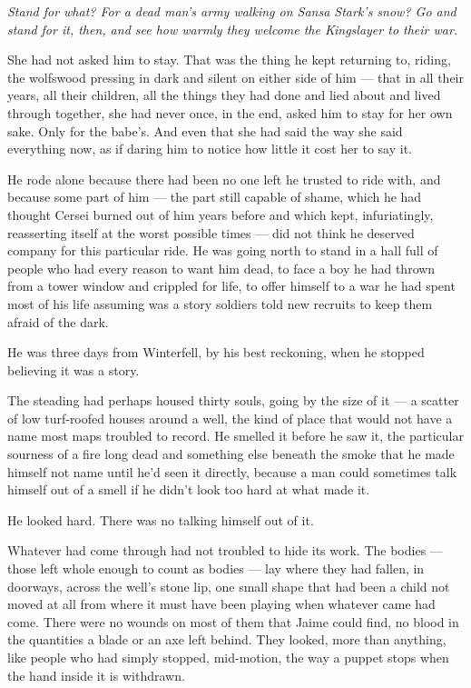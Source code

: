 \textit{Stand for what? For a dead man’s army walking on Sansa Stark’s snow? Go and stand for it, then, and see how warmly they welcome the Kingslayer to their war.}

She had not asked him to stay. That was the thing he kept returning to, riding, the wolfswood pressing in dark and silent on either side of him — that in all their years, all their children, all the things they had done and lied about and lived through together, she had never once, in the end, asked him to stay for her own sake. Only for the babe’s. And even that she had said the way she said everything now, as if daring him to notice how little it cost her to say it.

He rode alone because there had been no one left he trusted to ride with, and because some part of him — the part still capable of shame, which he had thought Cersei burned out of him years before and which kept, infuriatingly, reasserting itself at the worst possible times — did not think he deserved company for this particular ride. He was going north to stand in a hall full of people who had every reason to want him dead, to face a boy he had thrown from a tower window and crippled for life, to offer himself to a war he had spent most of his life assuming was a story soldiers told new recruits to keep them afraid of the dark.

He was three days from Winterfell, by his best reckoning, when he stopped believing it was a story.

\sceneBreak

The steading had perhaps housed thirty souls, going by the size of it — a scatter of low turf-roofed houses around a well, the kind of place that would not have a name most maps troubled to record. He smelled it before he saw it, the particular sourness of a fire long dead and something else beneath the smoke that he made himself not name until he’d seen it directly, because a man could sometimes talk himself out of a smell if he didn’t look too hard at what made it.

He looked hard. There was no talking himself out of it.

Whatever had come through had not troubled to hide its work. The bodies — those left whole enough to count as bodies — lay where they had fallen, in doorways, across the well’s stone lip, one small shape that had been a child not moved at all from where it must have been playing when whatever came had come. There were no wounds on most of them that Jaime could find, no blood in the quantities a blade or an axe left behind. They looked, more than anything, like people who had simply stopped, mid-motion, the way a puppet stops when the hand inside it is withdrawn.


